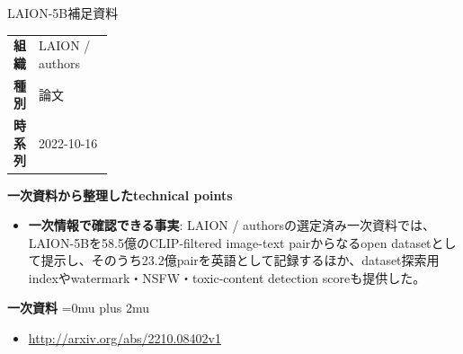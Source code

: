 \begin{technicalnote}{LAION-5B}{補足資料}
\begingroup
\begin{tabularx}{\linewidth}{@{}>{\bfseries}p{0.22\linewidth}X@{}}
組織 & LAION / authors \\
種別 & 論文 \\
時系列 & 2022-10-16 \\
\end{tabularx}
\smallskip
{\bfseries 一次資料から整理したtechnical points}
\begin{itemize}[leftmargin=1.5em,itemsep=0.35em]
\item \textbf{一次情報で確認できる事実}: LAION / authorsの選定済み一次資料では、LAION-5Bを58.5億のCLIP-filtered image-text pairからなるopen datasetとして提示し、そのうち23.2億pairを英語として記録するほか、dataset探索用indexやwatermark・NSFW・toxic-content detection scoreも提供した。
\end{itemize}
\begin{minipage}{\linewidth}
\begin{samepage}
{\bfseries 一次資料}
\begingroup\sloppy
\Urlmuskip=0mu plus 2mu\relax
\begin{itemize}[leftmargin=1.5em,itemsep=0.25em]
\item {\scriptsize\url{http://arxiv.org/abs/2210.08402v1}}
\end{itemize}
\endgroup
\end{samepage}
\end{minipage}
\endgroup
\end{technicalnote}
\medskip

